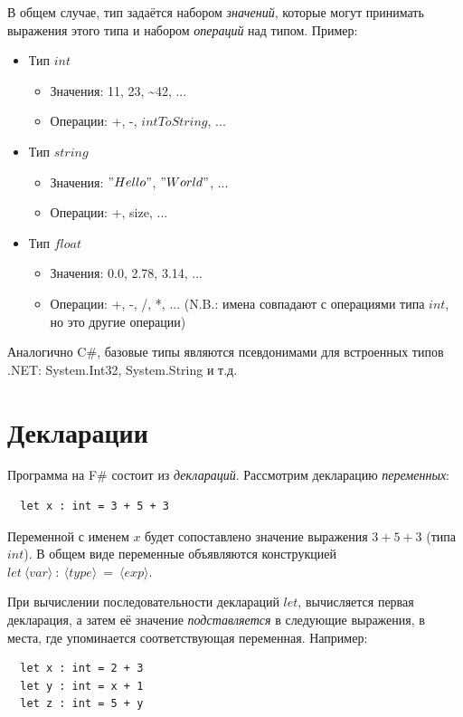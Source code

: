 \documentclass[a4paper,11pt]{article}
\begin{document}
В общем случае, тип задаётся набором \emph{значений}, которые могут принимать
выражения этого типа и набором \emph{операций} над типом. Пример:
\begin{itemize}
\item Тип $int$
  \begin{itemize}
  \item Значения: 11, 23, \textasciitilde 42, ...
  \item Операции: +, -, $intToString$, ...
  \end{itemize}
\item Тип $string$
  \begin{itemize}
  \item Значения: $"Hello"$, $"World"$, ...
  \item Операции: +, size, ...
  \end{itemize}
\item Тип $float$
  \begin{itemize}
  \item Значения: 0.0, 2.78, 3.14, ...
  \item Операции: +, -, /, *, ... (N.B.: имена совпадают с операциями типа
    $int$, но это другие операции)
  \end{itemize}
\end{itemize}

Аналогично C\#, базовые типы являются псевдонимами для встроенных типов .NET:
System.Int32, System.String и т.д.

\section{Декларации}

Программа на F\# состоит из \emph{деклараций}. Рассмотрим декларацию
\emph{переменных}:
\begin{lstlisting}
  let x : int = 3 + 5 + 3
\end{lstlisting}

Переменной с именем $x$ будет сопоставлено значение выражения $3 + 5 + 3$ (типа
$int$). В общем виде переменные объявляются конструкцией 
$let~\langle var \rangle~:~\langle type \rangle~=~\langle exp \rangle$.

При вычислении последовательности деклараций $let$, вычисляется первая
декларация, а затем её значение \emph{подставляется} в следующие выражения,
в места, где упоминается соответствующая переменная. Например:
\begin{lstlisting}
  let x : int = 2 + 3
  let y : int = x + 1
  let z : int = 5 + y
\end{lstlisting}
\end{document}

